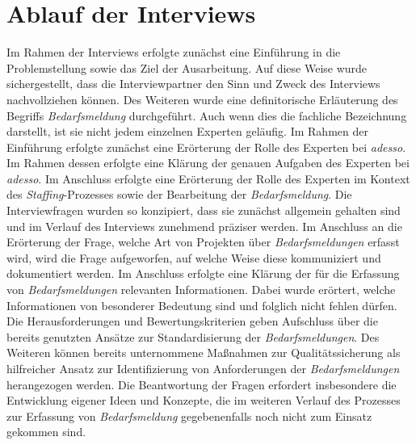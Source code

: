 \section{Ablauf der Interviews}
\label{sec:ablaufexperteninterviews}
Im Rahmen der Interviews erfolgte zunächst eine Einführung in die Problemstellung sowie das Ziel der Ausarbeitung. Auf diese Weise wurde sichergestellt, dass die Interviewpartner den Sinn und Zweck des Interviews nachvollziehen können. Des Weiteren wurde eine definitorische Erläuterung des Begriffs \emph{Bedarfsmeldung} durchgeführt. Auch wenn dies die fachliche Bezeichnung darstellt, ist sie nicht jedem einzelnen Experten geläufig. Im Rahmen der Einführung erfolgte zunächst eine Erörterung der Rolle des Experten bei \emph{adesso}. Im Rahmen dessen erfolgte eine Klärung der genauen Aufgaben des Experten bei \emph{adesso}. Im Anschluss erfolgte eine Erörterung der Rolle des Experten im Kontext des \emph{Staffing}-Prozesses sowie der Bearbeitung der \emph{Bedarfsmeldung}. Die Interviewfragen wurden so konzipiert, dass sie zunächst allgemein gehalten sind und im Verlauf des Interviews zunehmend präziser werden. Im Anschluss an die Erörterung der Frage, welche Art von Projekten über \emph{Bedarfsmeldungen} erfasst wird, wird die Frage aufgeworfen, auf welche Weise diese kommuniziert und dokumentiert werden. Im Anschluss erfolgte eine Klärung der für die Erfassung von \emph{Bedarfsmeldungen} relevanten Informationen. Dabei wurde erörtert, welche Informationen von besonderer Bedeutung sind und folglich nicht fehlen dürfen. Die Herausforderungen und Bewertungskriterien geben Aufschluss über die bereits genutzten Ansätze zur Standardisierung der \emph{Bedarfsmeldungen}. Des Weiteren können bereits unternommene Maßnahmen zur Qualitätssicherung als hilfreicher Ansatz zur Identifizierung von Anforderungen der \emph{Bedarfsmeldungen} herangezogen werden. Die Beantwortung der Fragen erfordert insbesondere die Entwicklung eigener Ideen und Konzepte, die im weiteren Verlauf des Prozesses zur Erfassung von \emph{Bedarfsmeldung} gegebenenfalls noch nicht zum Einsatz gekommen sind.
